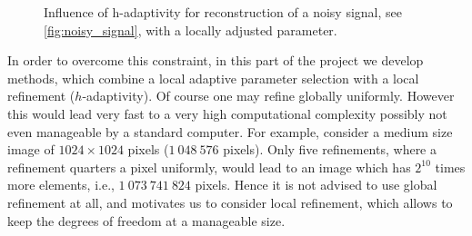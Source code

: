 \documentclass[enabledeprecatedfontcommands,cleardoublepage=empty,headsepline,twoside,11pt,DIV=15,BCOR=12mm,final]{scrartcl}
\begin{document}
\begin{figure}[h!]
\begin{center}
\hspace{0.2cm}
\hspace{0.2cm}
\caption{Influence of h-adaptivity for reconstruction of a noisy signal, see \ref{fig:noisy_signal},  with a locally adjusted parameter.}\label{fig:1Dsignal}
\end{center}
\end{figure}


In order to overcome this constraint, in this part of the project we develop methods, which combine a local adaptive parameter selection with a local refinement ($h$-adaptivity). Of course one may refine globally uniformly. However this would lead very fast to a very high computational complexity possibly not even manageable by a standard computer. For example, consider a medium size image of $1024 \times 1024$ pixels ($1\ 048\ 576$ pixels). Only five refinements, where a refinement quarters a pixel uniformly, would lead to an image which has $2^{10}$ times more elements, i.e., $1\ 073\ 741\ 824$ pixels. Hence it is not advised to use global refinement at all, and motivates us to consider local refinement, which allows to keep the degrees of freedom at a manageable size.
\end{document}
